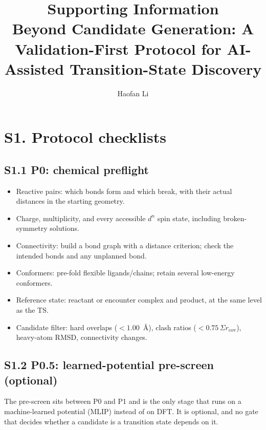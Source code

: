 \documentclass[11pt,a4paper]{article}
\title{Supporting Information\\[4pt]
\large Beyond Candidate Generation: A Validation-First Protocol for AI-Assisted Transition-State Discovery}
\author{Haofan Li}
\date{}
\begin{document}
\maketitle

\section*{S1. Protocol checklists}

\subsection*{S1.1 P0: chemical preflight}
\begin{itemize}
\item Reactive pairs: which bonds form and which break, with their actual distances in the starting geometry.
\item Charge, multiplicity, and every accessible $d^n$ spin state, including broken-symmetry solutions.
\item Connectivity: build a bond graph with a distance criterion; check the intended bonds and any unplanned bond.
\item Conformers: pre-fold flexible ligands/chains; retain several low-energy conformers.
\item Reference state: reactant or encounter complex and product, at the same level as the TS.
\item Candidate filter: hard overlaps ($<1.00$~\AA{}), clash ratios ($<0.75\,\Sigma r_{\mathrm{cov}}$), heavy-atom RMSD, connectivity changes.
\end{itemize}

\subsection*{S1.2 P0.5: learned-potential pre-screen (optional)}
The pre-screen sits between P0 and P1 and is the only stage that runs on a
machine-learned potential (MLIP) instead of on DFT. It is optional, and no gate that
decides whether a candidate is a transition state depends on it.
\end{document}
